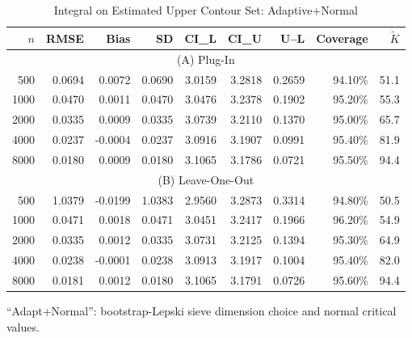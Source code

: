\documentclass[12pt,american]{article}
\theoremstyle{definition}
\theoremstyle{plain}
\theoremstyle{definition}
\theoremstyle{plain}
\theoremstyle{plain}
\theoremstyle{plain}
\theoremstyle{plain}
\theoremstyle{plain}
\begin{document}
\begin{table}[h!]
  \centering
  \caption{\label{tab:Sim2_Disk}Integral on Estimated Upper Contour Set: Adaptive+Normal}
  \begin{threeparttable}
    \begin{tabular}{rrrrrrrrr}
      \toprule
      $n$ & RMSE & Bias & SD & CI\_L & CI\_U & U--L & Coverage & $\tilde{K}$ \\
      \midrule
      \multicolumn{9}{c}{(A) Plug-In} \\
      \midrule
      500  & 0.0694 &  0.0072 & 0.0690 & 3.0159 & 3.2818 & 0.2659 & 94.10\% & 51.1 \\
      1000  & 0.0470 &  0.0011 & 0.0470 & 3.0476 & 3.2378 & 0.1902 & 95.20\% & 55.3 \\
      2000  & 0.0335 &  0.0009 & 0.0335 & 3.0739 & 3.2110 & 0.1370 & 95.00\% & 65.7 \\
      4000  & 0.0237 & -0.0004 & 0.0237 & 3.0916 & 3.1907 & 0.0991 & 95.40\% & 81.9 \\
      8000  & 0.0180 &  0.0009 & 0.0180 & 3.1065 & 3.1786 & 0.0721 & 95.50\% & 94.4 \\
      \midrule
      \multicolumn{9}{c}{(B) Leave-One-Out} \\
      \midrule
      500  & 1.0379 & -0.0199 & 1.0383 & 2.9560 & 3.2873 & 0.3314 & 94.80\% & 50.5 \\
      1000  & 0.0471 &  0.0018 & 0.0471 & 3.0451 & 3.2417 & 0.1966 & 96.20\% & 54.9 \\
      2000  & 0.0335 &  0.0012 & 0.0335 & 3.0731 & 3.2125 & 0.1394 & 95.30\% & 64.9 \\
      4000  & 0.0238 & -0.0001 & 0.0238 & 3.0913 & 3.1917 & 0.1004 & 95.40\% & 82.0 \\
      8000  & 0.0181 &  0.0012 & 0.0180 & 3.1065 & 3.1791 & 0.0726 & 95.60\% & 94.4 \\
      \bottomrule
    \end{tabular}
    \begin{tablenotes}
      \footnotesize
    \item ``Adapt+Normal'': bootstrap-Lepski sieve dimension choice and normal critical values.
    \end{tablenotes}
  \end{threeparttable}
\end{table}
\end{document}
